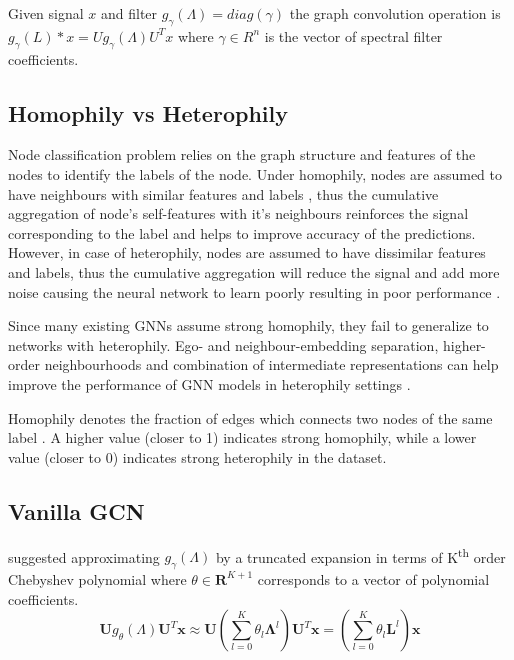 \documentclass{article}
\begin{document}
Given signal $x$ and filter $g_{\gamma }(\Lambda) = diag(\gamma)$ the graph convolution operation is $g_\gamma (L)\ast x = U g_\gamma(\Lambda)U^Tx$ where $\gamma \in R^n$ is the vector of spectral filter coefficients.

\subsection{Homophily vs Heterophily} \label{Homophily}
Node classification problem relies on the graph structure and features of the nodes to identify the labels of the node. Under homophily, nodes are assumed to have neighbours with similar features and labels \cite{liu2020non}, thus the cumulative aggregation of node’s self-features with it's neighbours reinforces the signal corresponding to the label and helps to improve accuracy of the predictions. However, in case of heterophily, nodes are assumed to have dissimilar features and labels, thus the cumulative aggregation will reduce the signal and add more noise causing the neural network to learn poorly resulting in poor performance \cite{maurya2021improving, zhu2020beyond}. 

Since many existing GNNs assume strong homophily, they fail to generalize to networks with heterophily. Ego- and neighbour-embedding separation, higher-order neighbourhoods and combination of intermediate representations can help improve the performance of GNN models in heterophily settings \cite{zhu2020beyond}. 

Homophily  denotes the fraction of edges which connects two nodes of the same label \cite{liu2020non}. A higher value (closer to 1) indicates strong homophily, while a lower value (closer to 0) indicates strong heterophily in the dataset.

\subsection{Vanilla GCN} \label{GCN}
\citet{hammond2011wavelets} suggested approximating $g_\gamma(\Lambda)$ by a truncated expansion in terms of  K\textsuperscript{th} order Chebyshev polynomial where $\theta \in\mathbf{R}^{K+1}$ corresponds to a vector of polynomial coefficients. 
\begin{equation}
\mathbf{U}g_{\theta}\left(\Lambda\right)\mathbf{U}^{T}\mathbf{x}\approx
\mathbf{U}\left(\sum_{l = 0}^{K}\theta_l\mathbf{\Lambda }^l\right)\mathbf{U}^T\mathbf{x}
=\left(\sum_{l = 0}^{K}\theta_l\mathbf{L}^l\right)\mathbf{x}
\end{equation}
\end{document}
